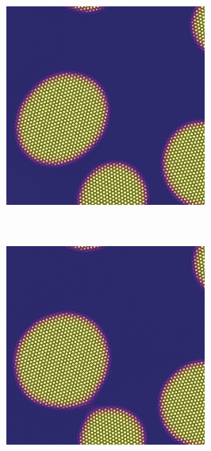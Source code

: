 \documentclass[showkeys, prb, reprint]{revtex4-1}
\begin{document}
\begin{figure}
    \vspace{0.25cm}
    \begin{subfigure}[b]{0.3\columnwidth}
        \includegraphics[width=\textwidth]{crystalgrowth}
        \label{fig:crystalgrowth}
        \caption{}
    \end{subfigure}
    ~
    \begin{subfigure}[b]{0.3\columnwidth}
        \includegraphics[width=\textwidth]{crystalgrowth2}

\end{subfigure}
\end{figure}
\end{document}
